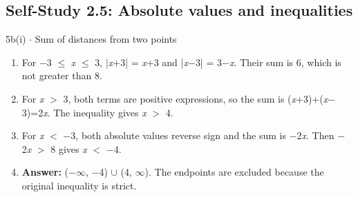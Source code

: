 \documentclass[11pt]{article}
\begin{document}
\begin{keepsection}\subsection{Self-Study 2.5: Absolute values and inequalities}

\begin{workedbox}{5b(i) \ensuremath{\cdot} Sum of distances from two points}
\begin{enumerate}
\item For \ensuremath{-}3 \ensuremath{\leq} \textit{x} \ensuremath{\leq} 3, |\textit{x}+3| = \textit{x}+3 and |\textit{x}\ensuremath{-}3| = 3\ensuremath{-}\textit{x}. Their sum is 6, which is not greater than 8.
\item For \textit{x} \ensuremath{>} 3, both terms are positive expressions, so the sum is (\textit{x}+3)+(\textit{x}\ensuremath{-}3)=2\textit{x}. The inequality gives \textit{x} \ensuremath{>} 4.
\item For \textit{x} \ensuremath{<} \ensuremath{-}3, both absolute values reverse sign and the sum is \ensuremath{-}2\textit{x}. Then \ensuremath{-}2\textit{x} \ensuremath{>} 8 gives \textit{x} \ensuremath{<} \ensuremath{-}4.
\item \textbf{Answer:} (\ensuremath{-}\ensuremath{\infty}, \ensuremath{-}4) \ensuremath{\cup} (4, \ensuremath{\infty}). The endpoints are excluded because the original inequality is strict.
\end{enumerate}
\end{workedbox}

\end{keepsection}
\end{document}
